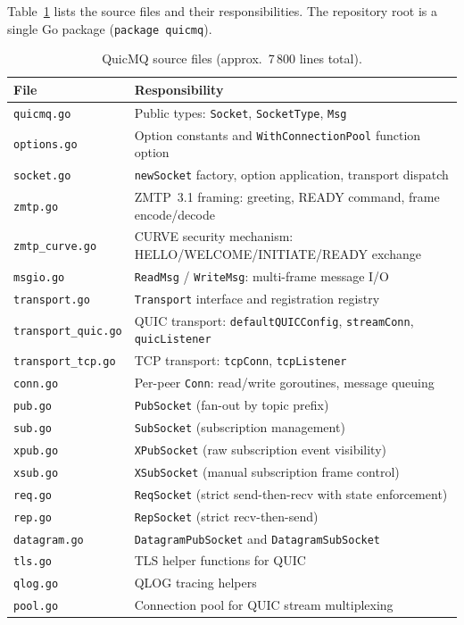 \documentclass[12pt, a4paper, oneside]{report}
\begin{document}
Table~\ref{tab:files} lists the source files and their responsibilities. The repository root is a single Go package (\texttt{package quicmq}).

\begin{table}[H]
  \centering
  \caption{QuicMQ source files (approx.\ 7\,800 lines total).}
  \label{tab:files}
  \begin{tabularx}{\textwidth}{lX}
    \toprule
    \textbf{File} & \textbf{Responsibility} \\
    \midrule
    \texttt{quicmq.go}          & Public types: \texttt{Socket}, \texttt{SocketType}, \texttt{Msg} \\
    \texttt{options.go}         & Option constants and \texttt{WithConnectionPool} function option \\
    \texttt{socket.go}          & \texttt{newSocket} factory, option application, transport dispatch \\
    \texttt{zmtp.go}            & ZMTP~3.1 framing: greeting, READY command, frame encode/decode \\
    \texttt{zmtp\_curve.go}     & CURVE security mechanism: HELLO/WELCOME/INITIATE/READY exchange \\
    \texttt{msgio.go}           & \texttt{ReadMsg} / \texttt{WriteMsg}: multi-frame message I/O \\
    \texttt{transport.go}       & \texttt{Transport} interface and registration registry \\
    \texttt{transport\_quic.go} & QUIC transport: \texttt{defaultQUICConfig}, \texttt{streamConn}, \texttt{quicListener} \\
    \texttt{transport\_tcp.go}  & TCP transport: \texttt{tcpConn}, \texttt{tcpListener} \\
    \texttt{conn.go}            & Per-peer \texttt{Conn}: read/write goroutines, message queuing \\
    \texttt{pub.go}             & \texttt{PubSocket} (fan-out by topic prefix) \\
    \texttt{sub.go}             & \texttt{SubSocket} (subscription management) \\
    \texttt{xpub.go}            & \texttt{XPubSocket} (raw subscription event visibility) \\
    \texttt{xsub.go}            & \texttt{XSubSocket} (manual subscription frame control) \\
    \texttt{req.go}             & \texttt{ReqSocket} (strict send-then-recv with state enforcement) \\
    \texttt{rep.go}             & \texttt{RepSocket} (strict recv-then-send) \\
    \texttt{datagram.go}        & \texttt{DatagramPubSocket} and \texttt{DatagramSubSocket} \\
    \texttt{tls.go}             & TLS helper functions for QUIC \\
    \texttt{qlog.go}            & QLOG tracing helpers \\
    \texttt{pool.go}            & Connection pool for QUIC stream multiplexing \\
    \bottomrule
  \end{tabularx}
\end{table}
\end{document}
